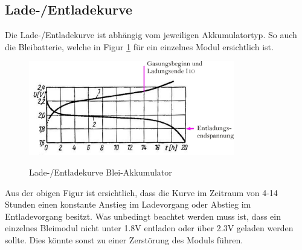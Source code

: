 \newpage

\subsection{Lade-/Entladekurve}

Die Lade-/Entladekurve ist abhängig vom jeweiligen Akkumulatortyp. So auch die Bleibatterie, welche in Figur \ref{fig:pb_akku_kurve} für ein einzelnes Modul ersichtlich ist.

\begin{figure}[h!]
	\centering
		\includegraphics[width=0.8\textwidth]{images/pb_akku_kurve.jpg}
	\caption{Lade-/Entladekurve Blei-Akkumulator}
	\label{fig:pb_akku_kurve}
	\cite{pb_akku_kurve}
\end{figure}

Aus der obigen Figur ist ersichtlich, dass die Kurve im Zeitraum von 4-14 Stunden einen konstante Anstieg im Ladevorgang oder Abstieg im Entladevorgang besitzt. Was unbedingt beachtet werden muss ist, dass ein einzelnes Bleimodul nicht unter 1.8V entladen oder über 2.3V geladen werden sollte. Dies könnte sonst zu einer Zerstörung des Moduls führen.

\newpage
